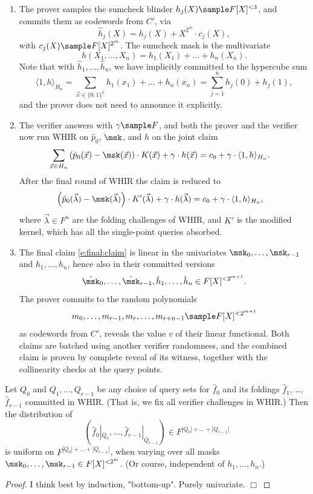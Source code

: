 \begin{enumerate}
\item 
The prover samples the sumcheck blinder $h_j(X)\sample F[X]^{<3}$, and commits them as codewords from $C'$, via
\[
\hat h_j(X) = h_j(X) + X^{2^m} \cdot c_j(X),
\]
with $c_j(X)\sample F[X]^{2^m}$.
The sumcheck mask is the multivariate 
\[
h(X_1,\ldots, X_n) = h_1(X_1) + \ldots + h_n(X_n).
\]
Note that with $\hat h_1,\ldots, \hat h_n$, we have implicitly committed to the hypercube sum
\[
\langle 1, h\rangle_{H_n} = \sum_{\vec x \in\{0,1\}^n} h_1(x_1)+ \ldots + h_n(x_n)
= \sum_{j=1}^n h_j(0) + h_j(1),
\]
and the prover does not need to announce it explicitly. 

\item
The verifier answers with $\gamma\sample F$, and both the prover and the verifier now run WHIR on $\hat p_0$, $\msk$, and $h$ on the joint claim
\begin{align*}
\sum_{\vec x\in H_n} 
\left(\hat p_0(\vec x) - \msk(\vec x) \right) 
\cdot K(\vec x) + \gamma\cdot h(\vec x)  &= c_0 + \gamma \cdot \langle 1, h\rangle_{H_n}.
\end{align*}
After the final round of WHIR the claim is reduced to 
\begin{align}
\label{e:final:claim}
\left(\hat p_0(\vec \lambda) - \msk(\vec \lambda) \right) 
\cdot K'(\vec \lambda) + \gamma\cdot h(\vec \lambda)  &= c_0 + \gamma \cdot \langle 1, h\rangle_{H_n}, %
\end{align}
where $\vec\lambda\in F^n$ are the folding challenges of WHIR, and $K'$ is the modified kernel, which has all the single-point queries absorbed. 

\item 
The final claim \eqref{e:final:claim} is linear in the univariates $\msk_0,\ldots, \msk_{r-1}$ and $h_1,\ldots, h_n$, hence also in their committed versions 
\[
\hat\msk_0,\ldots, \hat\msk_{r-1},\hat h_1,\ldots, \hat h_n \in F[X]^{<2^{m+1}}.
\]
The prover commits to the random polynomials
\[
m_0,\ldots, m_{r-1}, m_r, \ldots, m_{r+n-1} \sample F[X]^{<2^{m+1}} 
\]
as codewords from $C'$, reveals the value $v$ of their linear functional.
Both claims are batched using another verifier randomness, and the combined claim is proven by complete reveal of its witness, together with the collinearity checks at the query points. 
\end{enumerate}


\begin{lem}
Let $Q_0$ and  $Q_1, \ldots, Q_{r-1}$ be any choice of query sets for $\hat f_0$ and its foldings $\hat f_1$, \ldots, $\hat f_{r-1}$ committed in WHIR.
(That is, we fix all verifier challenges in WHIR.)
Then the distribution of 
\[
\left(\hat f_0|_{Q_0}, \ldots, \hat f_{r-1}|_{Q_{r-1}}\right)
\in F^{|Q_0|+\ldots +|Q_{r-1}|}
\]
is uniform on $F^{|Q_0|+\ldots +|Q_{r-1}|}$, when varying over all masks $\msk_0,\ldots,\msk_{r-1}\in F[X]^{<2^m}$.
(Or course, independent of $h_1,\ldots, h_n$.)
\end{lem}
\begin{proof}
I think best by induction, "bottom-up".
Purely univariate.
$\Box$
\end{proof}


